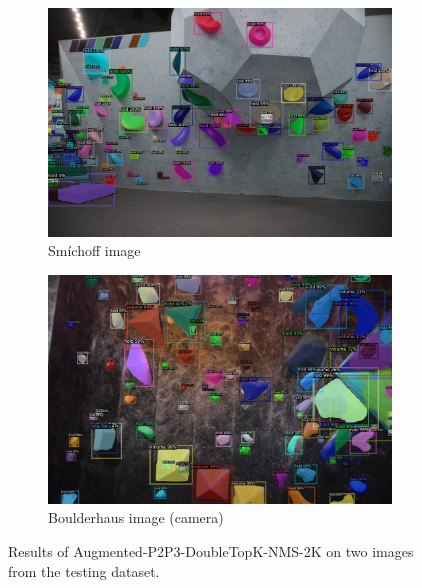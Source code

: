 \documentclass[final]{cvpr}
\begin{document}
\begin{figure}[t!]  %
\centering%
\begin{subfigure}{0.488\linewidth}%
\centering%
\includegraphics[width = \linewidth]{img/converted-sm-image.jpg}%
\caption{Smíchoff image}%
\end{subfigure}\quad
\begin{subfigure}{0.488\linewidth}%
\centering%
\includegraphics[width = \linewidth]{img/converted-bh-image.jpg}%
\caption{Boulderhaus image (camera)}%
\end{subfigure}
\caption{Results of Augmented-P2P3-DoubleTopK-NMS-2K on two images from the testing dataset.}%
\label{fig:results-sm-bh}%
\end{figure}
\end{document}
